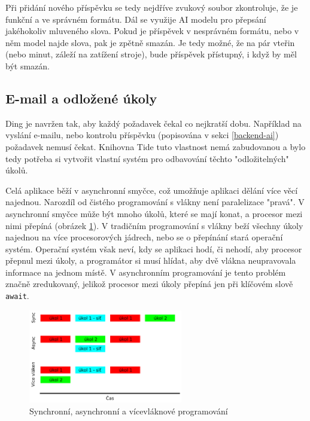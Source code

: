 Při přidání nového příspěvku se tedy nejdříve zvukový soubor zkontroluje, že je funkční a ve
správném formátu. Dál se využije AI modelu pro přepsání jakéhokoliv mluveného slova. Pokud je
příspěvek v nesprávném formátu, nebo v něm model najde slova, pak je zpětně smazán. Je tedy možné,
že na pár vteřin (nebo minut, záleží na zatížení stroje), bude příspěvek přístupný, i když by měl
být smazán.

\subsection{E-mail a odložené úkoly}

Ding je navržen tak, aby každý požadavek čekal co nejkratší dobu. Například na vyslání e-mailu, nebo
kontrolu příspěvku (popisována v sekci \ref{backend-ai}) požadavek nemusí čekat. Knihovna Tide tuto
vlastnost nemá zabudovanou a bylo tedy potřeba si vytvořit vlastní systém pro odbavování těchto
"odložitelných" úkolů.

Celá aplikace běží v asynchronní smyčce, což umožňuje aplikaci dělání více věcí najednou. Narozdíl
od čistého programování s vlákny není paralelizace "pravá". V asynchronní smyčce může být mnoho
úkolů, které se mají konat, a procesor mezi nimi přepíná (obrázek \ref{async-diagram}). V tradičním
programování s vlákny beží všechny úkoly najednou na více procesorových jádrech, nebo se o přepínání
stará operační systém. Operační systém však neví, kdy se aplikaci hodí, či nehodí, aby procesor
přepnul mezi úkoly, a programátor si musí hlídat, aby dvě vlákna neupravovala informace na jednom
místě. V asynchronním programování je tento problém značně zredukovaný, jelikož procesor mezi úkoly
přepíná jen při klíčovém slově \texttt{await}.

\begin{figure}[h!] 
    \centering
    \includegraphics[width=0.6\textwidth]{images/async.png}
    \caption{Synchronní, asynchronní a vícevláknové programování}
    \label{async-diagram}
\end{figure}

